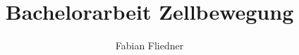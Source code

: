 \documentclass[]{article}
\title{Bachelorarbeit Zellbewegung}
\author{Fabian Fliedner}
\begin{document}
\maketitle

\begin{abstract}

\end{abstract}

\section{}
\end{document}
